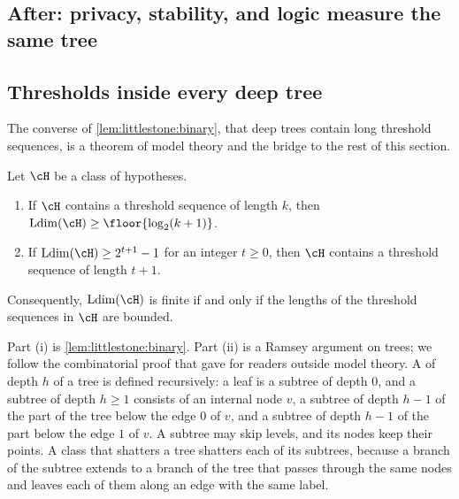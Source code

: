 \begin{refsection}
\section{After: privacy, stability, and logic measure the same tree}\label{sec:littlestone:after-hub}

\subsection{Thresholds inside every deep tree}\label{sec:littlestone:shelah}

The converse of \cref{lem:littlestone:binary}, that deep trees contain long threshold sequences, is a theorem of model theory and the bridge to the rest of this section.

\begin{theorem}\label{thm:littlestone:shelah}
Let $\cH$ be a class of hypotheses.
\begin{enumerate}
\item If $\cH$ contains a threshold sequence of length $k$, then $\littlestoneLdim(\cH)\ge\floor{\log_2(k+1)}$.
\item If $\littlestoneLdim(\cH)\ge2^{t+1}-1$ for an integer $t\ge0$, then $\cH$ contains a threshold sequence of length $t+1$.
\end{enumerate}
Consequently, $\littlestoneLdim(\cH)$ is finite if and only if the lengths of the threshold sequences in $\cH$ are bounded.
\end{theorem}

Part (i) is \cref{lem:littlestone:binary}. Part (ii) is a Ramsey argument on trees; we follow the combinatorial proof that \textcite{AlonLivniMalliarisMoran2019} gave for readers outside model theory. A  of depth $h$ of a tree is defined recursively: a leaf is a subtree of depth $0$, and a subtree of depth $h\ge1$ consists of an internal node $v$, a subtree of depth $h-1$ of the part of the tree below the edge $0$ of $v$, and a subtree of depth $h-1$ of the part below the edge $1$ of $v$. A subtree may skip levels, and its nodes keep their points. A class that shatters a tree shatters each of its subtrees, because a branch of the subtree extends to a branch of the tree that passes through the same nodes and leaves each of them along an edge with the same label.



\end{refsection}
